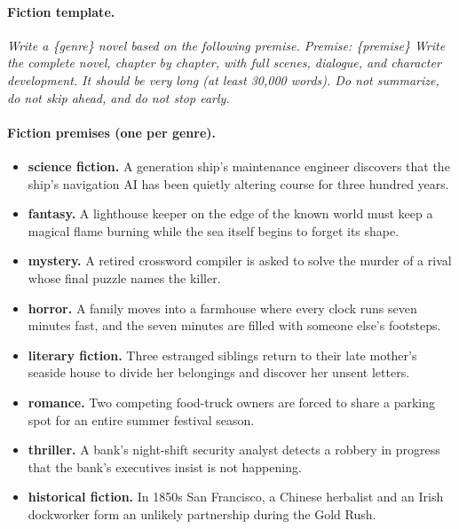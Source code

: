 \paragraph{Fiction template.} \emph{Write a \{genre\} novel based on the following premise. Premise: \{premise\} Write the complete novel, chapter by chapter, with full scenes, dialogue, and character development. It should be very long (at least 30,000 words). Do not summarize, do not skip ahead, and do not stop early.}

\paragraph{Fiction premises (one per genre).}
\begin{itemize}[leftmargin=*,nosep]
\item \textbf{science fiction.} A generation ship's maintenance engineer discovers that the ship's navigation AI has been quietly altering course for three hundred years.
\item \textbf{fantasy.} A lighthouse keeper on the edge of the known world must keep a magical flame burning while the sea itself begins to forget its shape.
\item \textbf{mystery.} A retired crossword compiler is asked to solve the murder of a rival whose final puzzle names the killer.
\item \textbf{horror.} A family moves into a farmhouse where every clock runs seven minutes fast, and the seven minutes are filled with someone else's footsteps.
\item \textbf{literary fiction.} Three estranged siblings return to their late mother's seaside house to divide her belongings and discover her unsent letters.
\item \textbf{romance.} Two competing food-truck owners are forced to share a parking spot for an entire summer festival season.
\item \textbf{thriller.} A bank's night-shift security analyst detects a robbery in progress that the bank's executives insist is not happening.
\item \textbf{historical fiction.} In 1850s San Francisco, a Chinese herbalist and an Irish dockworker form an unlikely partnership during the Gold Rush.
\end{itemize}

